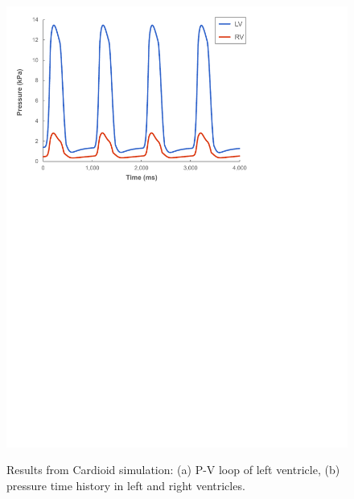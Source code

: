 \begin{figure}[ht]
{		\includegraphics[scale=0.5]{media/4-cardioid/5-pv/pressure_volume-2.pdf}
\label{fig:pv2}}		
%
\caption{Results from Cardioid simulation: (a) P-V loop of left ventricle, (b) pressure time history in left and right ventricles.}
\label{fig:pv}
\end{figure}

